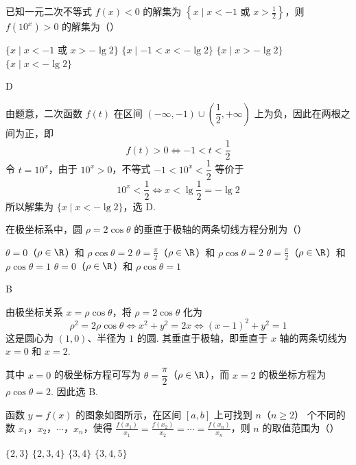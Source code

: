 \begin{problem}
已知一元二次不等式 \( f(x) < 0 \) 的解集为 \( \left\{x \mid x < -1 \text{\ 或\ } x > \frac{1}{2}\right\} \)，则 \( f(10^x) > 0 \) 的解集为（\quad）

\choices
    {\(\{x \mid x < -1 \text{\ 或\ } x > -\lg 2\}\)}
    {\(\{x \mid -1 < x < -\lg 2\}\)}
    {\(\{x \mid x > -\lg 2\}\)}
    {\(\{x \mid x < -\lg 2\}\)}
\end{problem}

\begin{answer}
D
\end{answer}

\begin{solution}
由题意，二次函数 \(f(t)\) 在区间 \((-\infty,-1)\cup\left(\dfrac12,+\infty\right)\) 上为负，因此在两根之间为正，即
\[
f(t)>0\Longleftrightarrow -1<t<\frac12
\]
令 \(t=10^x\)，由于 \(10^x>0\)，不等式 \(-1<10^x<\dfrac12\) 等价于
\[
10^x<\frac12\Longleftrightarrow x<\lg\frac12=-\lg2
\]
所以解集为 \(\{x\mid x<-\lg2\}\)，选 D.
\end{solution}

\begin{problem}
在极坐标系中，圆 \(\rho = 2\cos \theta\) 的垂直于极轴的两条切线方程分别为（\quad）

\choices
    {\(\theta = 0\)（\(\rho \in \R\)）和 \(\rho \cos \theta = 2\)}
    {\(\theta = \frac{\pi}{2}\)（\(\rho \in \R\)）和 \(\rho \cos \theta = 2\)}
    {\(\theta = \frac{\pi}{2}\)（\(\rho \in \R\)）和 \(\rho \cos \theta = 1\)}
    {\(\theta = 0\)（\(\rho \in \R\)）和 \(\rho \cos \theta = 1\)}
\end{problem}

\begin{answer}
B
\end{answer}

\begin{solution}
由极坐标关系 \(x=\rho\cos\theta\)，将 \(\rho=2\cos\theta\) 化为
\[
\rho^2=2\rho\cos\theta\Longleftrightarrow x^2+y^2=2x
\Longleftrightarrow (x-1)^2+y^2=1
\]
这是圆心为 \((1,0)\)、半径为 \(1\) 的圆. 其垂直于极轴，即垂直于 \(x\) 轴的两条切线为 \(x=0\) 和 \(x=2\).

其中 \(x=0\) 的极坐标方程可写为 \(\theta=\dfrac\pi2\)（\(\rho\in\R\)），而 \(x=2\) 的极坐标方程为 \(\rho\cos\theta=2\). 因此选 B.
\end{solution}

\begin{problem}
函数 \( y = f(x) \) 的图象如图所示，在区间 \([a, b]\) 上可找到 \(n\)（\(n \geqslant 2\)） 个不同的数 \(x_1\)，\(x_2\)，\(\cdots\)，\(x_n\)，使得 \( \frac{f(x_1)}{x_1} = \frac{f(x_2)}{x_2} = \cdots = \frac{f(x_n)}{x_n} \)，则 \( n \) 的取值范围为（\quad）


\choices
    {\( \{2, 3\} \)}
    {\( \{2, 3, 4\} \)}
    {\( \{3, 4\} \)}
    {\( \{3, 4, 5\} \)}
\end{problem}

